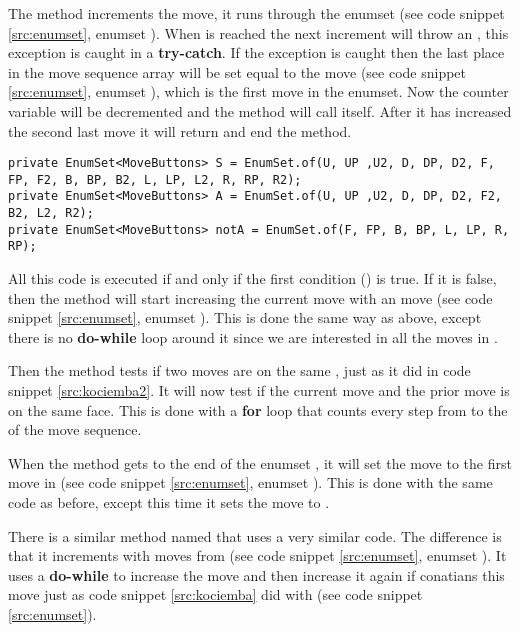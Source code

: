 The method increments the move, it runs through the enumset  (see code snippet \ref{src:enumset}, enumset ).
When  is reached the next increment will throw an , this exception is caught in a \textbf{try-catch}.
If the exception is caught then the last place in the move sequence array will be set equal to the move (see code snippet \ref{src:enumset}, enumset ), which is the first move in the enumset.
Now the counter variable  will be decremented and the method will call itself.
After it has increased the second last move it will return and end the method.

\begin{lstlisting}[style=sourceCode, caption=\myCaption{The definition of the enumsets S, A, and notA.}, label=src:enumset]
private EnumSet<MoveButtons> S = EnumSet.of(U, UP ,U2, D, DP, D2, F, FP, F2, B, BP, B2, L, LP, L2, R, RP, R2);
private EnumSet<MoveButtons> A = EnumSet.of(U, UP ,U2, D, DP, D2, F2, B2, L2, R2);
private EnumSet<MoveButtons> notA = EnumSet.of(F, FP, B, BP, L, LP, R, RP);
\end{lstlisting}

All this code is executed if and only if the first condition () is true.
If it is false, then the method will start increasing the current move with an  move (see code snippet \ref{src:enumset}, enumset ).
This is done the same way as above, except there is no \textbf{do-while} loop around it since we are interested in all the moves in .

Then the method tests if two moves are on the same \face{}, just as it did in code snippet \ref{src:kociemba2}.
It will now test if the current move and the prior move is on the same face.
This is done with a \textbf{for} loop that counts every step from  to the  of the move sequence.

When the method gets to the end of the enumset , it will set the move to the first move in  (see code snippet \ref{src:enumset}, enumset ).
This is done with the same code as before, except this time it sets the move to .

There is a similar method named  that uses a very similar code.
The difference is that it increments with moves from  (see code snippet \ref{src:enumset}, enumset ).
It uses a \textbf{do-while} to increase the move  and then increase it again if  conatians this move just as code snippet \ref{src:kociemba} did with  (see code snippet \ref{src:enumset}).